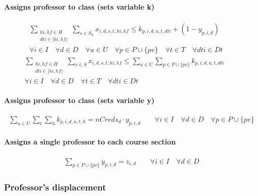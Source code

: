 \paragraph{Assigns professor to class (sets variable k)}
\begin{eqnarray}
\sum_{ \substack {hi,hf \in H \\ dti \in [hi,hf)} } \sum\limits_{s\in S_{u}} x_{i,d,s,t,hi,hf} \le k_{p,i,d,u,t,dti} + ( 1 - y_{p,i,d} ) \nonumber \qquad
\\
\forall i \in I \quad
\forall d \in D \quad
\forall u \in U \quad
\forall p \in P \cup \{pv\} \quad
\forall t \in T \quad
\forall dti \in Dt \nonumber
\end{eqnarray}
\begin{eqnarray}
\sum_{ \substack {hi,hf \in H \\ dti \in [hi,hf)} } \sum\limits_{s\in S} x_{i,d,s,t,hi,hf} \le \sum\limits_{u\in U} \sum\limits_{p \in P \cup \{pv\}} k_{p,i,d,u,t,dti} \nonumber \qquad
\\
\forall i \in I \quad
\forall d \in D \quad
\forall t \in T \quad
\forall dti \in Dt \nonumber
\end{eqnarray}
	
\paragraph{Assigns professor to class (sets variable y)}
\begin{eqnarray}
\sum\limits_{u \in U} \sum\limits_{t} \sum\limits_{h} k_{p,i,d,u,t,h} = nCreds_{d} \cdot y_{p,i,d} \nonumber \qquad
\forall i \in I \quad
\forall d \in D \quad
\forall p \in P \cup \{pv\}
\end{eqnarray}	
	
\paragraph{Assigns a single professor to each course section}
\begin{eqnarray}
\sum\limits_{p\in P \cup \{pv\}} y_{p,i,d} = z_{i,d} \nonumber \qquad
\forall i \in I \quad
\forall d \in D
\end{eqnarray}	


\subsubsection{Professor's displacement}
\label{constrProfessorDisplac}

